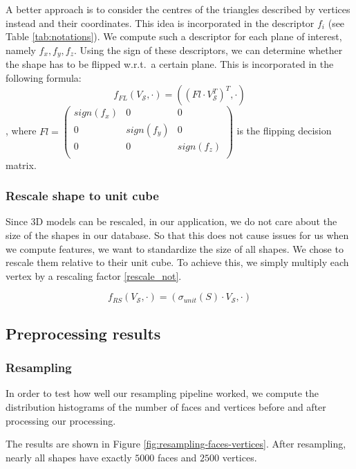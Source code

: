 A better approach is to consider the centres of the triangles described by vertices instead and their coordinates.
This idea is incorporated in the descriptor $f_i$ (see Table \ref{tab:notations}).
We compute such a descriptor for each plane of interest, namely $f_x, f_y, f_z$.
Using the sign of these descriptors, we can determine whether the shape has to be flipped w.r.t.\ a
certain plane.
This is incorporated in the following formula:
\begin{equation}
    f_{FL}(V_{\mathcal{S}}, \cdot) = ((Fl \cdot V_{\mathcal{S}}^T)^T, \cdot)
\end{equation},
where $Fl = \begin{pmatrix}
    sign(f_x) & 0 & 0 \\
    0 & sign(f_y) & 0 \\
    0 & 0 & sign(f_z) \\
\end{pmatrix}$ is the flipping decision matrix.

\subsubsection{Rescale shape to unit cube}
Since 3D models can be rescaled, in our application, we do not care about the size of the shapes in our database.
So that this does not cause issues for us when we compute features, we want to standardize the size of all shapes.
We chose to rescale them relative to their unit cube.
To achieve this, we simply multiply each vertex by a rescaling factor \ref{rescale_not}.

\begin{equation}
    f_{RS}(V_{\mathcal{S}}, \cdot) = (\sigma_{unit}(S) \cdot V_{\mathcal{S}}, \cdot)
\end{equation}

\subsection{Preprocessing results}

\subsubsection{Resampling}
In order to test how well our resampling pipeline worked, we compute the distribution histograms of the number of
faces and vertices before and after processing our processing.

The results are shown in Figure \ref{fig:resampling-faces-vertices}.
After resampling, nearly all shapes have exactly $5000$ faces and $2500$ vertices.


